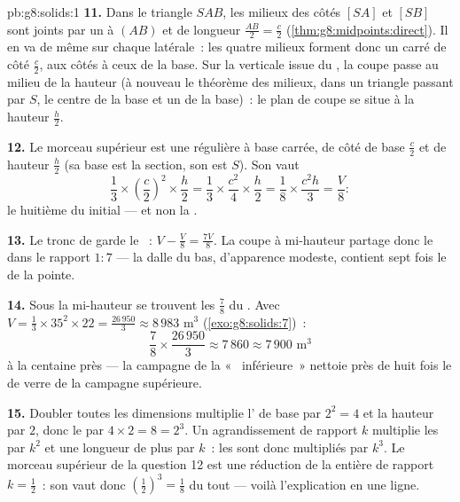 \begin{solution}{pb:g8:solids:1}
\textbf{11.} Dans le triangle $SAB$, les milieux des côtés $[SA]$ et
$[SB]$ sont joints par un   à $(AB)$ et de longueur
$\frac{AB}{2} = \frac{c}{2}$ (\cref{thm:g8:midpoints:direct}). Il en
va de même sur chaque  latérale~: les quatre milieux forment
donc un carré de côté $\frac c2$, aux côtés  à ceux de la
base. Sur la verticale issue du , la coupe passe au milieu de
la hauteur (à nouveau le théorème des milieux, dans un triangle
passant par $S$, le centre de la base et un  de la base)~: le
plan de coupe se situe à la hauteur $\frac h2$.

\textbf{12.} Le morceau supérieur est une  régulière à base
carrée, de côté de base $\frac c2$ et de hauteur $\frac h2$ (sa base
est la section, son  est $S$). Son  vaut
\[
\frac13 \times \left(\frac c2\right)^2 \times \frac h2
= \frac13 \times \frac{c^2}{4} \times \frac h2
= \frac{1}{8} \times \frac{c^2 h}{3}
= \frac{V}{8} :
\]
le huitième du  initial --- et non la .

\textbf{13.} Le tronc de  garde le ~:
$V - \frac V8 = \frac{7V}{8}$. La coupe à mi-hauteur partage donc le
 dans le rapport $1 : 7$ --- la dalle du bas, d'apparence
modeste, contient sept fois le  de la pointe.

\textbf{14.} Sous la mi-hauteur se trouvent les $\frac78$ du .
Avec $V = \frac13 \times 35^2 \times 22 = \frac{26\,950}{3} \approx
8\,983$ m$^3$ (\cref{exo:g8:solids:7})~:
\[
\frac78 \times \frac{26\,950}{3} \approx 7\,860 \approx
7\,900 \text{ m}^3
\]
à la centaine près --- la campagne de la «~ inférieure~»
nettoie près de huit fois le  de verre de la campagne
supérieure.

\textbf{15.} Doubler toutes les dimensions multiplie l' de base
par $2^2 = 4$ et la hauteur par $2$, donc le  par
$4 \times 2 = 8 = 2^3$. Un agrandissement de rapport $k$ multiplie
les  par $k^2$ et une longueur de plus par $k$~: les 
sont donc multipliés par $k^3$. Le morceau supérieur de la question
12 est une réduction de la  entière de rapport
$k = \frac12$~: son  vaut donc
$\left(\frac12\right)^3 = \frac18$ du tout --- voilà l'explication
en une ligne.
\end{solution}
